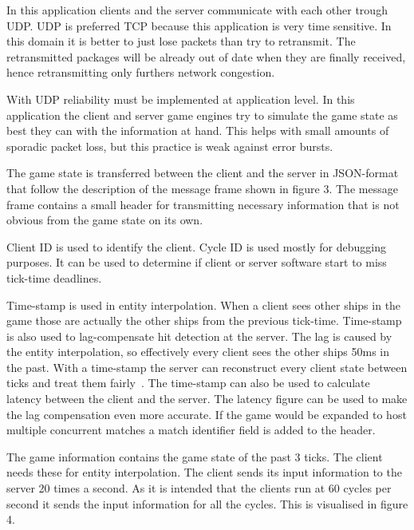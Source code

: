 \documentclass[10pt,a4paper]{article}
\begin{document}
 In this application clients and the server communicate with each other trough
 UDP. UDP is preferred TCP because this application is very time sensitive.  In
 this domain it is better to just lose packets than try to retransmit. The
 retransmitted packages will be already out of date when they are finally
 received, hence retransmitting only furthers network congestion.

 With UDP reliability must be implemented at application level. In this
 application the client and server game engines try to simulate the game state
 as best they can with the information at hand. This helps with small amounts
 of sporadic packet loss, but this practice is weak against error bursts. 

 The game state is transferred between the client and the server in JSON-format
 that follow the description of the message frame shown in figure 3.  The
 message frame contains a small header for transmitting necessary information
 that is not obvious from the game state on its own.  


 Client ID is used to identify the client.
 Cycle ID is used mostly for debugging purposes. It 
 can be used to determine if client or server software start
 to miss tick-time deadlines.

 Time-stamp is used in entity interpolation.  When a client sees other ships in
 the game those are actually the other ships from the previous tick-time.
 Time-stamp is also used to lag-compensate hit detection at the server.  The
 lag is caused by the entity interpolation, so effectively every client sees
 the other ships 50ms in the past. With a time-stamp the server can reconstruct
 every client state between ticks and treat them fairly~\cite{bernier_latency}.
 The time-stamp can also be used to calculate latency between the client and
 the server. The latency figure can be used to make the lag compensation even
 more accurate.  If the game would be expanded to host multiple concurrent
 matches a match identifier field is added to the header.

The game information contains the game state of the past 3 ticks. The client
needs these for entity interpolation. The client sends its input information
to the server 20 times a second. As it is intended that the clients run at 60 cycles
per second it sends the input information for all the cycles. This is visualised in 
figure 4.
 
\end{document}
